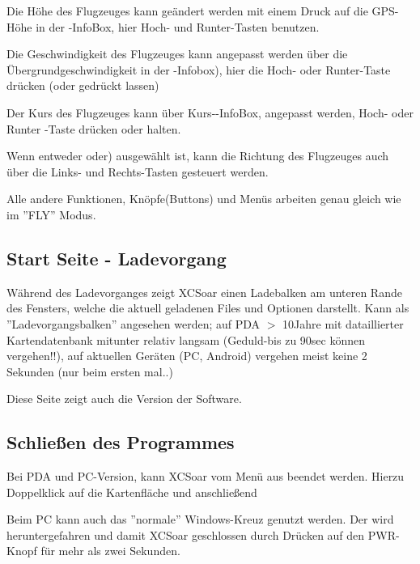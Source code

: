 Die Höhe des Flugzeuges kann geändert werden mit einem Druck auf die GPS-Höhe in der -InfoBox, hier Hoch- und Runter-Tasten benutzen. 

Die Geschwindigkeit des Flugzeuges kann angepasst werden über die Übergrundgeschwindigkeit in der -Infobox), hier die Hoch- oder Runter-Taste drücken (oder gedrückt lassen)

Der Kurs des Flugzeuges kann über Kurs--InfoBox, angepasst werden, Hoch- oder Runter -Taste drücken oder halten. 

Wenn entweder  oder) ausgewählt ist, 
kann die Richtung des Flugzeuges auch über die Links- und Rechts-Tasten gesteuert werden.

Alle andere Funktionen, Knöpfe(Buttons) und Menüs arbeiten genau gleich wie im ''FLY'' Modus. 


\subsection*{Start Seite - Ladevorgang}
Während des Ladevorganges zeigt {\textsf  XCSoar} einen Ladebalken am unteren Rande des Fensters, 
welche die aktuell geladenen Files und Optionen darstellt. Kann als ''Ladevorgangsbalken'' angesehen werden;  auf PDA $>$ 10Jahre mit dataillierter Kartendatenbank mitunter 
relativ langsam (Geduld-bis zu 90sec können vergehen!!), auf aktuellen Geräten (PC, Android) vergehen meist keine 2 Sekunden (nur beim ersten mal..) 

Diese Seite zeigt auch die Version der Software.

\subsection*{Schließen des Programmes}
Bei PDA und PC-Version, kann {\textsf  XCSoar} vom Menü aus beendet werden. Hierzu Doppelklick auf die Kartenfläche und anschließend 
\begin{quote}
\end{quote}

Beim PC kann auch das ''normale'' Windows-Kreuz genutzt werden.
Der \al wird heruntergefahren und damit {\textsf  XCSoar} geschlossen durch Drücken auf den PWR-Knopf für mehr als zwei Sekunden.
